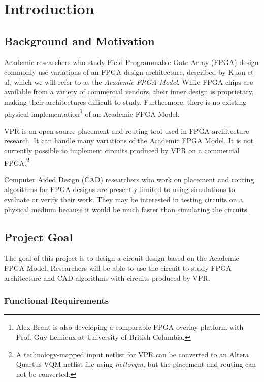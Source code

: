 \section{Introduction}



\subsection{Background and Motivation}

Academic researchers who study Field Programmable Gate Array (FPGA) design commonly use variations of an FPGA design architecture, described by Kuon et al\cite{fpga}, which we will refer to as the \emph{Academic FPGA Model}.
While FPGA chips are available from a variety of commercial vendors, their inner design is proprietary, making their architectures difficult to study.
Furthermore, there is no existing physical implementation\footnote{Alex Brant is also developing a comparable FPGA overlay platform with Prof. Guy Lemieux at University of British Columbia.} of an Academic FPGA Model.

VPR\cite{vpr} is an open-source placement and routing tool used in FPGA architecture research.
It can handle many variations of the Academic FPGA Model.
It is not currently possible to implement circuits produced by VPR on a commercial FPGA.\footnote{A technology-mapped input netlist for VPR can be converted to an Altera Quartus VQM netlist file using \emph{nettovqm}\cite{nettovqm}, but the placement and routing can not be converted.}

Computer Aided Design (CAD) researchers who work on placement and routing algorithms for FPGA designs are presently limited to using simulations to evaluate or verify their work.
They may be interested in testing circuits on a physical medium because it would be much faster than simulating the circuits.



\subsection{Project Goal}

The goal of this project is to design a circuit design based on the Academic FPGA Model.
Researchers will be able to use the circuit to study FPGA architecture and CAD algorithms with circuits produced by VPR.



\subsubsection{Functional Requirements}

